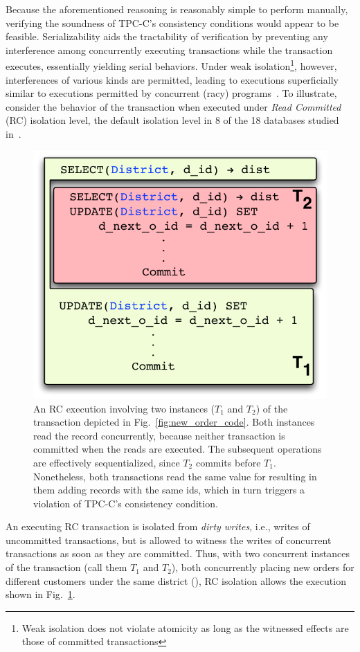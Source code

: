 Because the aforementioned reasoning is reasonably simple to perform
manually, verifying the soundness of TPC-C's consistency conditions
would appear to be feasible.  Serializability aids the tractability of
verification by preventing any interference among concurrently
executing transactions while the  transaction executes,
essentially yielding serial behaviors.  Under weak
isolation\footnote{Weak isolation does not violate atomicity as long
  as the witnessed effects are those of committed transactions},
however, interferences of various kinds are permitted, leading to
executions superficially similar to executions permitted by concurrent
(racy) programs~\cite{GHE15,HPQ+15}.  To illustrate, consider the
behavior of the  transaction when executed under
\emph{Read Committed} (RC) isolation level, the default isolation
level in 8 of the 18 databases studied in~\cite{bailishotos}.
\begin{figure}
\includegraphics[scale=0.45]{Figures/motiv-eg-1-b}
\caption{\small An RC execution involving two instances ($T_1$ and
  $T_2$) of the  transaction depicted in
  Fig.~\ref{fig:new_order_code}. 
  Both instances read the   record concurrently,
  because neither transaction is committed when the reads are
  executed.  The subsequent operations are effectively sequentialized,
  since $T_2$ commits before $T_1$. Nonetheless, both transactions read the same value for
   resulting in them  adding  records
  with the same ids, which in turn triggers a violation of TPC-C's
  consistency condition.}
\label{fig:new_order_exec}
\end{figure}
An executing RC transaction is isolated from \emph{dirty writes},
i.e., writes of uncommitted transactions, but is allowed to witness
the writes of concurrent transactions as soon as they are committed.
Thus, with two concurrent instances of the  transaction
(call them $T_1$ and $T_2$), both concurrently placing new orders for
different customers under the same district (), RC isolation
allows the execution shown in Fig.~\ref{fig:new_order_exec}.


